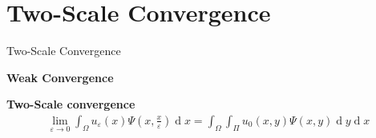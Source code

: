 \documentclass[10pt]{beamer}	%
\begin{document}
%
\section{Two-Scale Convergence}
\begin{frame}{Two-Scale Convergence}

\textbf{Weak Convergence}


\textbf{Two-Scale convergence}
\begin{align*}
\lim_{\varepsilon \to 0} \int_
{\Omega} u_\varepsilon (x) \Psi(x,\frac{x}{\varepsilon}) \operatorname d x = \int_{\Omega} \int_\Pi u_0(x,y) \Psi(x,y)\operatorname d y \operatorname d x
\end{align*}
\end{frame}




%
\end{document}
